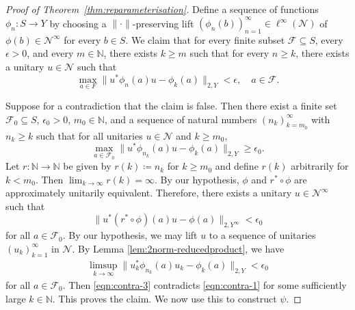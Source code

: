 \documentclass[a4paper,11pt]{amsart}
\theoremstyle{definition}
\numberwithin{equation}{section}
\numberwithin{theorem}{section}
\newcommand{\N}{\mathbb N}
\begin{document}
\begin{proof}[Proof of Theorem~\ref{thm:reparameterisation}]
	Define a sequence of functions $\phi_n\colon S \rightarrow Y$ by choosing a $\|\cdot\|$-preserving lift $(\phi_n(b))_{n=1}^\infty \in \ell^\infty(\mathcal{N})$ of $\phi(b) \in \mathcal{N}^\infty$ for every $b \in S$. 
	We claim that for every finite subset $\mathcal F \subseteq S$, every $\epsilon > 0$, and every $m \in \N$, there exists $k \geq m$ such that for every $n \geq k$, there exists a unitary $u \in \mathcal{N}$ such that
	\begin{equation}
		\max_{a \in F}\|u^*\phi_n(a)u - \phi_k(a)\|_{2,Y} < \epsilon,\quad a\in\mathcal F.
	\end{equation}  
	
	
Suppose for a contradiction that the claim is false. Then there exist a finite set $\mathcal F_0 \subseteq S$, $\epsilon_0 > 0$, $m_0 \in \N$, and a sequence of natural numbers $(n_k)_{k=m_0}^\infty$ with $n_k \geq k$ such that for all unitaries $u \in \mathcal{N}$ and $k\geq m_0$,
	\begin{equation}\label{eqn:contra-1}
		\max_{a \in \mathcal F_0}\|u^*\phi_{n_k}(a)u - \phi_k(a)\|_{2,Y} \geq \epsilon_0.
	\end{equation} 
Let $r:\N \rightarrow \N$ be given by $r(k) \coloneqq n_k$ for $k \geq m_0$ and define $r(k)$ arbitrarily for $k < m_0$. Then $\lim_{k\rightarrow\infty} r(k) = \infty$. By our hypothesis, $\phi$ and $r^* \circ \phi$ are approximately unitarily equivalent. Therefore, there exists a unitary $u \in \mathcal{N}^\infty$ such that
\begin{equation}\label{eqn:contra-2}
	\|u^*(r^* \circ\phi)(a)u - \phi(a)\|_{2,Y^\infty} < \epsilon_0
\end{equation}
for all $a \in \mathcal F_0$. By our hypothesis, we may lift $u$ to a sequence of unitaries $(u_k)_{k=1}^\infty$ in $\mathcal{N}$. By Lemma \ref{lem:2norm-reducedproduct}, we have 
\begin{equation}\begin{split}\label{eqn:contra-3}
	\limsup_{k\rightarrow\infty}\|u_k^*\phi_{n_k}(a)u_k - \phi_k(a)\|_{2,Y} < \epsilon_0
\end{split}\end{equation}
for all $a \in \mathcal F_0$. 
Then \eqref{eqn:contra-3} contradicts \eqref{eqn:contra-1} for some sufficiently large $k \in \N$. This proves the claim. We now use this to construct $\psi$. 


\end{proof}
\end{document}

